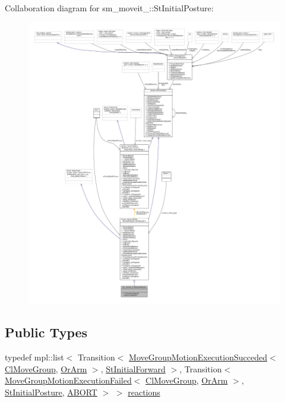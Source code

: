Collaboration diagram for sm\+\_\+moveit\+\_\+:\+:St\+Initial\+Posture\+:
\nopagebreak
\begin{figure}[H]
\begin{center}
\leavevmode
\includegraphics[width=350pt]{structsm__moveit__3_1_1StInitialPosture__coll__graph}
\end{center}
\end{figure}
\subsection*{Public Types}
\begin{DoxyCompactItemize}
\item 
typedef mpl\+::list$<$ Transition$<$ \hyperlink{structmove__group__interface__client_1_1MoveGroupMotionExecutionSucceded}{Move\+Group\+Motion\+Execution\+Succeded}$<$ \hyperlink{classmove__group__interface__client_1_1ClMoveGroup}{Cl\+Move\+Group}, \hyperlink{classsm__moveit__3_1_1OrArm}{Or\+Arm} $>$, \hyperlink{structsm__moveit__3_1_1StInitialForward}{St\+Initial\+Forward} $>$, Transition$<$ \hyperlink{structmove__group__interface__client_1_1MoveGroupMotionExecutionFailed}{Move\+Group\+Motion\+Execution\+Failed}$<$ \hyperlink{classmove__group__interface__client_1_1ClMoveGroup}{Cl\+Move\+Group}, \hyperlink{classsm__moveit__3_1_1OrArm}{Or\+Arm} $>$, \hyperlink{structsm__moveit__3_1_1StInitialPosture}{St\+Initial\+Posture}, \hyperlink{classABORT}{A\+B\+O\+RT} $>$ $>$ \hyperlink{structsm__moveit__3_1_1StInitialPosture_afe716a7a3d6ec5b5905e94c53245417d}{reactions}
\end{DoxyCompactItemize}
